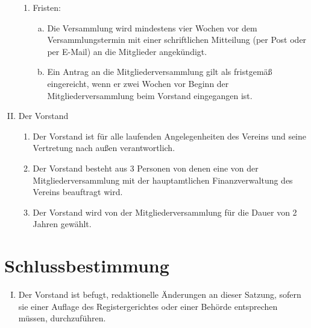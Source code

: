 \documentclass[12pt,a4paper,titlepage]{scrartcl}
\begin{document}
\begin{enumerate}[I.]
\begin{enumerate}[1.]
	\item Fristen:
		\begin{enumerate}[a)]
		\item Die Versammlung wird mindestens vier Wochen vor dem 
		Versammlungstermin mit einer schriftlichen Mitteilung (per Post oder per E-Mail) an die Mitglieder 
		angekündigt.
		\item Ein Antrag an die Mitgliederversammlung gilt als fristgemäß eingereicht, wenn 
		er zwei Wochen vor Beginn der Mitgliederversammlung beim Vorstand 
		eingegangen ist.
		\end{enumerate}
	\end{enumerate}
\item Der Vorstand
	\begin{enumerate}[1.]
	\item Der Vorstand ist für alle laufenden Angelegenheiten des Vereins und seine 			Vertretung nach außen verantwortlich.
	\item Der Vorstand besteht aus 3 Personen von denen eine von der Mitgliederversammlung mit der hauptamtlichen Finanzverwaltung des Vereins beauftragt wird.
	\item Der Vorstand wird von der Mitgliederversammlung für die Dauer von 2 Jahren gewählt.
	\end{enumerate}
\end{enumerate}


\section{Schlussbestimmung}
\begin{enumerate}[I.]
\item Der Vorstand ist befugt, redaktionelle Änderungen an dieser Satzung, sofern sie 
einer Auflage des Registergerichtes oder einer Behörde entsprechen müssen, 
durchzuführen.
\end{enumerate}
\end{document}
